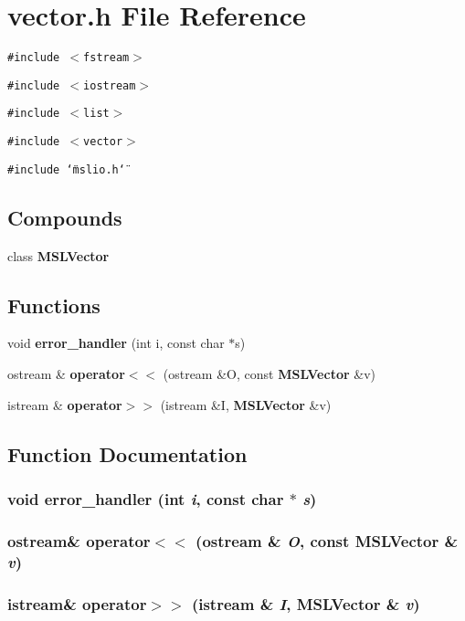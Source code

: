 \section{vector.h File Reference}
\label{vector_8h}
{\tt \#include $<$fstream$>$}\par
{\tt \#include $<$iostream$>$}\par
{\tt \#include $<$list$>$}\par
{\tt \#include $<$vector$>$}\par
{\tt \#include \char`\"{}mslio.h\char`\"{}}\par
\subsection*{Compounds}
\begin{CompactItemize}
\item 
class {\bf MSLVector}
\end{CompactItemize}
\subsection*{Functions}
\begin{CompactItemize}
\item 
void {\bf error\_\-handler} (int i, const char $\ast$s)
\item 
ostream \& {\bf operator$<$$<$} (ostream \&O, const {\bf MSLVector} \&v)
\item 
istream \& {\bf operator$>$$>$} (istream \&I, {\bf MSLVector} \&v)
\end{CompactItemize}


\subsection{Function Documentation}
\subsubsection{\setlength{\rightskip}{0pt plus 5cm}void error\_\-handler (int {\em i}, const char $\ast$ {\em s})}\label{vector_8h_a0}


\subsubsection{\setlength{\rightskip}{0pt plus 5cm}ostream\& operator$<$$<$ (ostream \& {\em O}, const {\bf MSLVector} \& {\em v})}\label{vector_8h_a1}


\subsubsection{\setlength{\rightskip}{0pt plus 5cm}istream\& operator$>$$>$ (istream \& {\em I}, {\bf MSLVector} \& {\em v})}\label{vector_8h_a2}


